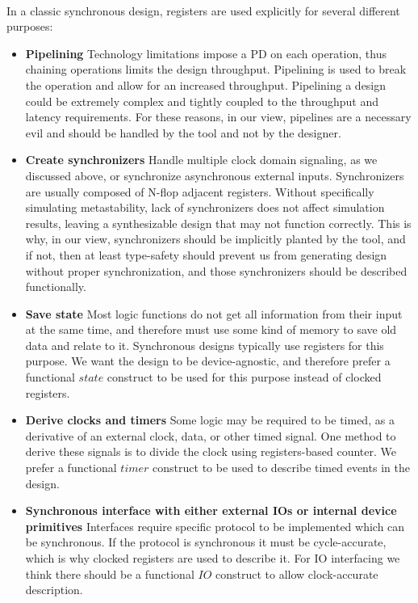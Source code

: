 \paragraph{}In a classic synchronous design, registers are used explicitly for several different purposes: 
\begin{itemize}
\item \textbf{Pipelining} \quad Technology limitations impose a PD on each operation, thus chaining operations limits the design throughput. Pipelining is used to break the operation and allow for an increased throughput. Pipelining a design could be extremely complex and tightly coupled to the throughput and latency requirements. For these reasons, in our view, pipelines are a necessary evil and should be handled by the tool and not by the designer.
\item \textbf{Create synchronizers} \quad Handle multiple clock domain signaling, as we discussed above, or synchronize asynchronous external inputs. Synchronizers are usually composed of N-flop adjacent registers. Without specifically simulating metastability, lack of synchronizers does not affect simulation results, leaving a synthesizable design that may not function correctly. This is why, in our view, synchronizers should be implicitly planted by the tool, and if not, then at least type-safety should prevent us from generating design without proper synchronization, and those synchronizers should be described functionally.
\item \textbf{Save state} \quad Most logic functions do not get all information from their input at the same time, and therefore must use some kind of memory to save old data and relate to it. Synchronous designs typically use registers for this purpose. We want the design to be device-agnostic, and therefore prefer a functional $state$ construct to be used for this purpose instead of clocked registers. 
\item \textbf{Derive clocks and timers} \quad Some logic may be required to be timed, as a derivative of an external clock, data, or other timed signal. One method to derive these signals is to divide the clock using registers-based counter. We prefer a functional $timer$ construct to be used to describe timed events in the design.
\item \textbf{Synchronous interface with either external IOs or internal device primitives} \quad Interfaces require specific protocol to be implemented which can be synchronous. If the protocol is synchronous it must be cycle-accurate, which is why clocked registers are used to describe it. For IO interfacing we think there should be a functional $IO$ construct to allow clock-accurate description.
\end{itemize}
